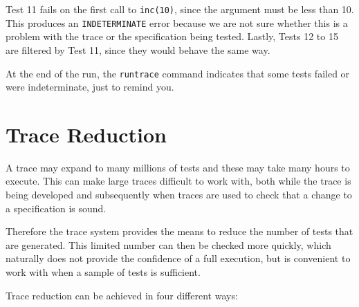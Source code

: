 \documentclass{overturerepchap}
\begin{document}
Test 11 fails on the first call to \texttt{inc(10)}, since the argument must be
less than 10. This produces an \texttt{INDETERMINATE} error because we are not
sure whether this is a problem with the trace or the specification being tested.
Lastly, Tests 12 to 15 are filtered by Test 11, since they would behave the same
way.

At the end of the run, the \texttt{runtrace} command indicates that some tests
failed or were indeterminate, just to remind you.

\section{Trace Reduction}

A trace may expand to many millions of tests and these may take many hours to
execute. This can make large traces difficult to work with, both while the trace
is being developed and subsequently when traces are used to check that a change
to a specification is sound.

Therefore the trace system provides the means to reduce the number of tests that
are generated. This limited number can then be checked more quickly, which
naturally does not provide the confidence of a full execution, but is convenient
to work with when a sample of tests is sufficient.

Trace reduction can be achieved in four different ways:
\end{document}
